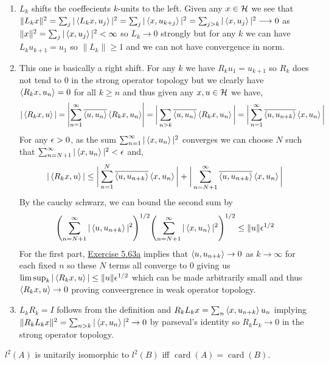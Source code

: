 \documentclass[12pt,a4paper]{article}
\begin{document}
\begin{solution}
    \begin{enumerate}[label=\alph*.]
        \item $L_k$ shifts the coeffecients $k$-units to the left. 
            Given any $x\in\mathcal{H}$ we see that $\|L_kx\|^2=\sum_j|\left\langle L_kx,u_j\right\rangle|^2=\sum_j|\left\langle x,u_{k+j}\right\rangle|^2=\sum_{j>k}|\left\langle x,u_j\right\rangle|^2\longrightarrow 0$ as $\|x\|^2=\sum_j|\left\langle x,u_j\right\rangle|^2<\infty$ so $L_k\to 0$ strongly but for any $k$ we can have $L_ku_{k+1}=u_1$ so $\|L_k\|\geq 1$ and we can not have convergence in norm. 
        \item This one is basically a right shift. 
            For any $k$ we have $R_ku_1=u_{k+1}$ so $R_k$ does not tend to $0$ in the strong operator topology but we clearly have $\left\langle R_kx,u_n\right\rangle=0$ for all $k\geq n$ and thus given any $x,u\in\mathcal{H}$ we have, 
            \[
                |\left\langle R_kx,u\right\rangle|=\qty|\sum_{n=1}^\infty \overline{\left\langle u,u_n\right\rangle}\left\langle R_kx,u_n\right\rangle|=\bigg|\sum_{n>k} \overline{\left\langle u,u_n\right\rangle}\left\langle R_kx,u_n\right\rangle\bigg|=\bigg|\sum_{n=1}^\infty\overline{\left\langle u,u_{n+k}\right\rangle}\left\langle x,u_n\right\rangle\bigg|
            \]
            For any $\epsilon>0$, as the sum $\sum_{n=1}^\infty |\left\langle x,u_n\right\rangle|^2$ converges we can choose $N$ such that $\sum_{n=N+1}^\infty |\left\langle x,u_n\right\rangle|^2<\epsilon$ and, 
            \[
                |\left\langle R_kx,u\right\rangle| \leq \bigg|\sum_{n=1}^N \overline{\left\langle u,u_{n+k}\right\rangle}\left\langle x,u_n\right\rangle\bigg| + \bigg|\sum_{n=N+1}^\infty \overline{\left\langle u,u_{n+k}\right\rangle}\left\langle x,u_n\right\rangle\bigg|
            \]
            By the cauchy schwarz, we can bound the second sum by
            \[
                \qty(\sum_{n=N+1}^\infty |\left\langle u,u_{n+k}\right\rangle|^2)^{1/2} \qty(\sum_{n=N+1}^\infty |\left\langle x,u_n\right\rangle|^2)^{1/2} \leq \|u\|\epsilon^{1/2} 
            \]
            For the first part, \hyperref[prob:5-63]{Exercise 5.63a} implies that $\left\langle u,u_{n+k}\right\rangle \to 0$ as $k \to \infty$ for each fixed $n$ so these $N$ terms all converge to $0$ giving us $\limsup_k|\left\langle R_kx,u\right\rangle|\leq\|u\|\epsilon^{1/2}$ which can be made arbitrarily small and thus $\left\langle R_kx,u\right\rangle\to 0$ proving conveergrence in weak operator topology. 
            
        \item $L_kR_k=I$ follows from the definition and $R_kL_kx=\sum_n\left\langle x,u_{n+k}\right\rangle u_n$ implying $\|R_kL_kx\|^2=\sum_{n>k}|\left\langle x,u_n\right\rangle|^2\to 0$ by parseval's identity so $R_kL_k\to 0$ in the strong operator topology. 
    \end{enumerate}
\end{solution}
\begin{problem}\label{prob:5-65}
$l^2(A)$ is unitarily isomorphic to $l^2(B)$ iff $\operatorname{card}(A) = \operatorname{card}(B)$.
\end{problem}
\end{document}

